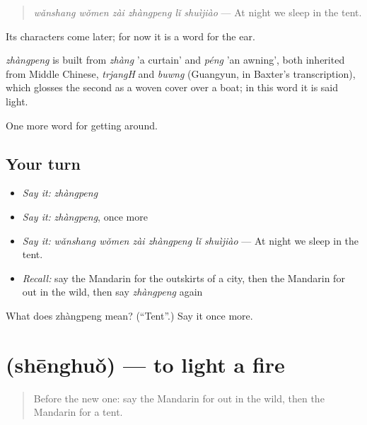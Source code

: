 \begin{quote}
\emph{wǎnshang wǒmen zài zhàngpeng lǐ shuìjiào} — At night we sleep in the tent.
\end{quote}

Its characters come later; for now it is a word for the ear.

\begin{cousinweb}
\emph{zhàngpeng} is built from \emph{zhàng} 'a curtain' and \emph{péng} 'an awning', both inherited from Middle Chinese, \emph{trjangH} and \emph{buwng} (Guangyun, in Baxter's transcription), which glosses the second as a woven cover over a boat; in this word it is said light.
\end{cousinweb}

\begin{grammarlens}[title={What you've built}]
One more word for getting around.
\end{grammarlens}

\subsection*{Your turn}
\begin{itemize}
\raggedright
  \item \emph{Say it:} \emph{zhàngpeng}
  \item \emph{Say it:} \emph{zhàngpeng}, once more
  \item \emph{Say it:} \emph{wǎnshang wǒmen zài zhàngpeng lǐ shuìjiào} — At night we sleep in the tent.
  \item \emph{Recall:} say the Mandarin for the outskirts of a city, then the Mandarin for out in the wild, then say \emph{zhàngpeng} again
\end{itemize}

\begin{tcolorbox}[breakable,colback=teal!4,colframe=teal!35!black,title={Before you move on}]
What does zhàngpeng mean? (\textquotedblleft{}Tent\textquotedblright{}.) Say it once more.
\end{tcolorbox}
\section[\texorpdfstring{\zh{生火} (shēnghuǒ)}{生火 (shēnghuǒ)}]{ (shēnghuǒ) — to light a fire}

\label{lesson:ZH-C441-shenghuo}



\begin{quote}
Before the new one: say the Mandarin for out in the wild, then the Mandarin for a tent.
\end{quote}

